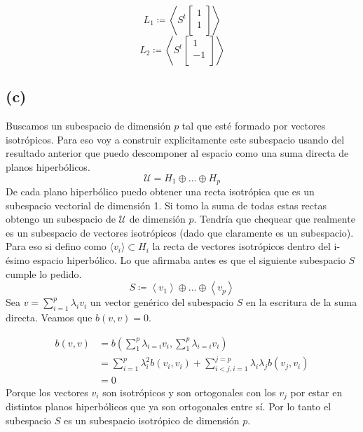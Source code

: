 \documentclass{article}
\begin{document}
\begin{equation*}
L_1	\coloneqq
\left\langle  S^t\begin{bmatrix}
1   \\
1  \\
\end{bmatrix}
\right\rangle 
\end{equation*}
\begin{equation*}
L_2	\coloneqq
\left\langle  S^t\begin{bmatrix}
1   \\
-1  \\
\end{bmatrix}
\right\rangle 
\end{equation*} 

\subsection*{(c)}
Buscamos un subespacio de dimensión $p$ tal que esté formado por vectores isotrópicos. Para eso voy a construir explicitamente este subespacio usando del resultado anterior  que puedo descomponer al espacio como una suma directa de planos hiperbólicos. 
\begin{equation*}
\mathcal{U} = H_1 \oplus \dots \oplus H_{p} 
\end{equation*}
De cada plano hiperbólico puedo obtener una recta isotrópica que es un subespacio vectorial de dimensión 1. Si tomo la suma de todas estas rectas obtengo un subespacio de $\mathcal{U}$ de dimensión $p$. Tendría que chequear que realmente es un subespacio de vectores isotrópicos (dado que claramente es un subespacio). Para eso si defino como $\langle v_i \rangle \subset H_i$ la recta de vectores isotrópicos dentro del i-ésimo espacio hiperbólico. Lo que afirmaba antes es que el siguiente subespacio $S$ cumple lo pedido.
\[S \coloneqq \left\langle v_1 \right\rangle \oplus \dots \oplus \left\langle v_p \right\rangle   \]
Sea $v= \sum_{i=1}^{p} \lambda_{i}v_{i}$ un vector genérico del subespacio $S$ en la escritura de la suma directa. Veamos que $b(v,v)=0$.

\begin{align*}
	b(v,v) &= b\left( \sum_{1}^{p} \lambda_{i=i}v_{i}, \sum_{1}^{p} \lambda_{i=i}v_{i}\right) \\
	& = \sum_{i=1}^{p} \lambda_{i}^{2} b(v_i,v_i) + \sum_{i<j, i=1}^{j=p} \lambda_{i}\lambda_{j} b(v_j,v_i) \\
	& = 0
\end{align*}
Porque los vectores $v_i$ son isotrópicos y son ortogonales con los $v_j$  por estar en distintos planos hiperbólicos que ya son ortogonales entre sí. Por lo tanto el subespacio $S$ es un subespacio isotrópico de dimensión $p$.
\end{document}
